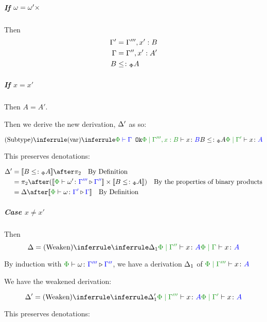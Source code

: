 \documentclass{report}
\begin{document}
        \subparagraph{If $\omega = \omega'\times$} 
        Then 
        \begin{align*}
            \Gamma' & = \Gamma''', x': B\\
            \Gamma &= \Gamma'', x': A'\\
            B & \leq\colon_\Phi A
        \end{align*}

        \subparagraph{If $x = x'$}

        Then $A = A'$.

        Then we derive the new derivation, $\Delta'$ as so:

        \begin{equation}
            \ntreeruleII{Subtype}{
                \ntreeruleI{var}{\oke{\P}{\G}}{\etyperelation{\P}{\G''', x: B}{x}{B}}
                }{
                B \subtypep A
            }{
                \etyperelation{\P}{\G'}{x}{A}
            }
        \end{equation}

        This preserves denotations:

        \begin{align*}
            \D' & = \deno{B\subtypep A}\after\pp\qt{By Definition} \\
             & = \pp\after (\deno{\ewrel{\P}{\w'}{\G'''}{\G''}}\times \deno{B\subtypep A}) \qt{By the properties of binary products}\\
             & = \D\after\deno{\ewrel{\P}{\w}{\G'}{\G}}\qt{By Definition}
        \end{align*}

        \subparagraph{Case $x \neq x'$}
        Then 
        \begin{equation}
            \D = \ntreeruleI{Weaken}{\treeruleI{\D_1}{\etyperelation{\P}{\G''}{x}{A}}}{\gpetyperelation{x}{A}}
        \end{equation}

        By induction with $\ewrel{\P}{\w}{\G'''}{\G''}$,
         we have a derivation $\Delta_1$ of $\etyperelation{\P}{\G'''}{x}{A}$

        We have the weakened derivation:

        \begin{equation}
            \D' = \ntreeruleI{Weaken}{\treeruleI{\D_1'}{\etyperelation{\P}{\G'''}{x}{A}}}{\etyperelation{\P}{\G'}{x}{A}}
        \end{equation}

        This preserves denotations:
\end{document}

